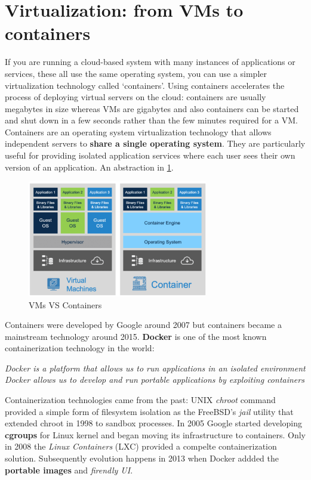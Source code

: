 \documentclass[10pt,a4paper]{report}
\begin{document}
\section{Virtualization: from VMs to containers}
If you are running a cloud-based system with many instances of applications or services, these all use the same operating system, you can use a simpler virtualization technology called ‘containers’.
Using containers accelerates the process of deploying virtual servers on
the cloud: containers are usually megabytes in size whereas VMs are gigabytes and also containers can be started and shut down in a few seconds rather than the few minutes required for a VM.
Containers are an operating system virtualization technology that allows
independent servers to \textbf{share a single operating system}. They are particularly useful for providing isolated application services where each user sees their own version of an application. An abstraction in \ref{image51}.

   \begin{figure}[h]
	\centering
	\includegraphics[width=0.7\textwidth]{image51}
	\caption{VMs VS Containers}
	\label{image51}
\end{figure}

Containers were developed by Google around 2007 but containers became a mainstream technology around 2015.
\textbf{Docker} is one of the most known containerization technology in the world:
\begin{center}
	\textit{
	Docker is a platform that allows us to run applications in an isolated environment \\
	Docker allows us to develop and run portable applications by exploiting containers
}
\end{center}

Containerization technologies came from the past: UNIX \textit{chroot} command provided a simple form of filesystem isolation as the FreeBSD's \textit{jail} utility that extended chroot in 1998 to sandbox processes. In 2005 Google started developing \textbf{cgroups} for Linux kernel and began moving its infrastructure to containers. Only in 2008 the \textit{Linux Containers} (LXC) provided a compelte containerization solution. 
Subsequently evolution happens in 2013 when Docker addded the \textbf{portable images} and \textit{firendly UI}. 
\end{document}
